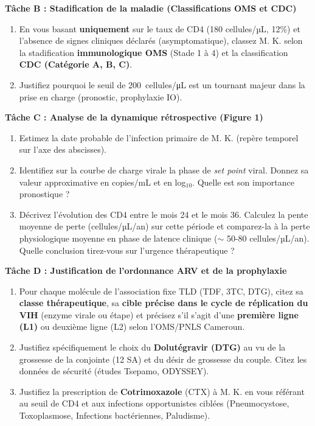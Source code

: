 \documentclass[11pt]{article}
\begin{document}
\textbf{Tâche B : Stadification de la maladie (Classifications OMS et CDC)}
\begin{enumerate}
    \item En vous basant \textbf{uniquement} sur le taux de CD4 (180 cellules/µL, 12\%) et l'absence de signes cliniques déclarés (asymptomatique), classez M. K. selon la stadification \textbf{immunologique OMS} (Stade 1 à 4) et la classification \textbf{CDC (Catégorie A, B, C)}.
    \item Justifiez pourquoi le seuil de \SI{200}{cellules/\micro\liter} est un tournant majeur dans la prise en charge (pronostic, prophylaxie IO).
\end{enumerate}

\textbf{Tâche C : Analyse de la dynamique rétrospective (Figure 1)}
\begin{enumerate}
    \item Estimez la date probable de l'infection primaire de M. K. (repère temporel sur l'axe des abscisses).
    \item Identifiez sur la courbe de charge virale la phase de \emph{set point} viral. Donnez sa valeur approximative en copies/mL et en log$_{10}$. Quelle est son importance pronostique ?
    \item Décrivez l'évolution des CD4 entre le mois 24 et le mois 36. Calculez la pente moyenne de perte (cellules/µL/an) sur cette période et comparez-la à la perte physiologique moyenne en phase de latence clinique ($\sim$ 50-80 cellules/µL/an). Quelle conclusion tirez-vous sur l'urgence thérapeutique ?
\end{enumerate}

\textbf{Tâche D : Justification de l'ordonnance ARV et de la prophylaxie}
\begin{enumerate}
    \item Pour chaque molécule de l'association fixe TLD (TDF, 3TC, DTG), citez sa \textbf{classe thérapeutique}, sa \textbf{cible précise dans le cycle de réplication du VIH} (enzyme virale ou étape) et précisez s'il s'agit d'une \textbf{première ligne (L1)} ou deuxième ligne (L2) selon l'OMS/PNLS Cameroun.
    \item Justifiez spécifiquement le choix du \textbf{Dolutégravir (DTG)} au vu de la grossesse de la conjointe (12 SA) et du désir de grossesse du couple. Citez les données de sécurité (études Tsepamo, ODYSSEY).
    \item Justifiez la prescription de \textbf{Cotrimoxazole} (CTX) à M. K. en vous référant au seuil de CD4 et aux infections opportunistes ciblées (Pneumocystose, Toxoplasmose, Infections bactériennes, Paludisme).
\end{enumerate}
\end{document}

